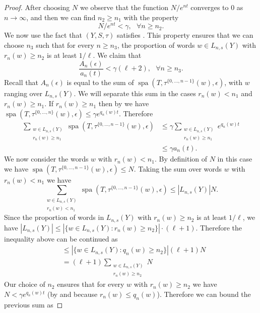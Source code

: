 \documentclass[10pt,a4paper]{amsart}
\newcommand{\spa}{\operatorname{spa}}
\begin{document}
\begin{proof}
    After choosing $N$ we observe that the function $N/e^{nt}$ converges to $0$ as $n\to\infty$, and then we can find $n_2\geq n_1$ with the property 
    \begin{equation}\label{property-of-n2}
    N/e^{nt}<\gamma, \ \ \ \forall n\geq n_2.\end{equation}
    We now use the fact that $(Y,S,\tau)$ satisfies  . This property ensures that we can choose $n_3$ such that for every $n\geq n_3$, the proportion of words $w\in L_{n,s}(Y)$ with $r_n(w)\geq n_2$ is at least $1/\ell$. We claim that \begin{equation}\label{bound-A_n/a_n}\frac{A_n(\epsilon)}{a_n(t)}<\gamma(\ell+2), \ \ \ \forall n\geq n_3.\end{equation}
    Recall that $A_n(\epsilon)$ is equal to the sum of $\spa(T,\tau^{\{0,\dots,n-1\}}(w),\epsilon)$, with $w$ ranging over $L_{n,s}(Y)$. We will separate this sum in the cases $r_n(w)<n_1$ and $r_n(w)\geq n_1$. If $r_n(w)\geq n_1$ then by  we have  
    $\spa(T,\tau^{\{0,\dots,n\}}(w),\epsilon)\leq \gamma e^{q_n(w)t}$. Therefore \begin{align*}\sum_{\substack{w\in L_{n,s}(Y)\\ r_n(w)\geq n_1}}\spa(T,\tau^{\{0,\dots,n-1\}}(w),\epsilon)&\leq \gamma\sum_{\substack{w\in L_{n,s}(Y)\\ r_n(w)\geq n_1}} e^{q_n(w)t} \\ &\leq \gamma a_n(t).
    \end{align*}
    We now consider the  words $w$ with $r_n(w)< n_1$.  By definition of $N$ in this case we have $\spa(T,\tau^{\{0,\dots,n-1\}}(w),\epsilon)\leq N$. Taking the sum over words $w$ with $r_n(w)< n_1$ we have
    \[\sum_{\substack{w\in L_{n,s}(Y)\\ r_n(w)< n_1}}\spa(T,\tau^{\{0,\dots,n-1\}}(w),\epsilon)\leq |L_{n,s}(Y)|N.
    \]
    Since the proportion of words in $L_{n,s}(Y)$ with $r_n(w)\geq n_2$ is at least $1/\ell$, we have $|L_{n,s}(Y)|\leq |\{w\in L_{n,s}(Y) : r_n(w)\geq n_2\}|\cdot (\ell+1)$. Therefore the inequality above can be continued as
    \begin{align*}
    &\leq |\{w\in L_{n,s}(Y) : q_n(w)\geq n_2\}| (\ell+1) N\\&=(\ell+1)\sum_{\substack{w\in L_{n,s}(Y)\\ r_n(w)\geq  n_2}} N
    \end{align*}
    Our choice of $n_2$ ensures that for every $w$ with $r_n(w)\geq n_2$ we have $N<\gamma e^{q_n(w)t}$ (by  and because  $r_n(w)\leq q_n(w)$). Therefore we can bound the previous sum as 

\end{proof}
\end{document}
